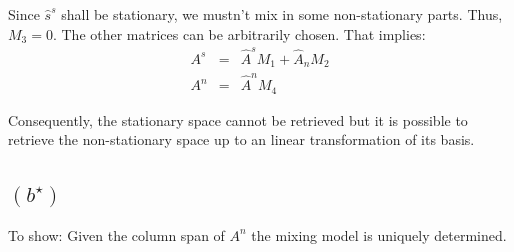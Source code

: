 \documentclass[a4paper, 12pt, titlepage]{article}
\begin{document}
Since $\hat s^s$ shall be stationary, we mustn't mix in some non-stationary parts.
Thus, $M_3=0$.
The other matrices can be arbitrarily chosen.
That implies:
\begin{eqnarray}
	A^s &=& \hat A^s M_1 + \hat A_n M_2\\
	A^n &=& \hat A^n M_4
\end{eqnarray}

Consequently, the stationary space cannot be retrieved but it is possible to retrieve the non-stationary space up to an linear transformation of its basis.

\subsection*{$\left( b^\star \right)$}

To show: Given the column span of $A^n$ the mixing model is uniquely determined.
\end{document}
